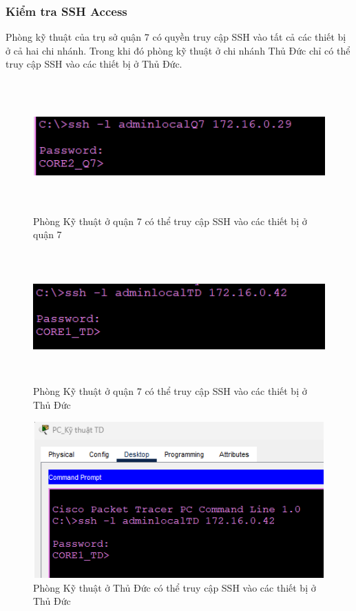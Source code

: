 \documentclass[a4paper, 12pt]{article}
\begin{document}
\subsubsection{Kiểm tra SSH Access}
\hspace*{0.25cm}Phòng kỹ thuật của trụ sở quận 7 có quyền truy cập SSH vào tất cả các thiết bị ở cả hai chi nhánh. Trong khi đó phòng kỹ thuật ở chi nhánh Thủ Đức chỉ có thể truy cập SSH vào các thiết bị ở Thủ Đức.\\
\begin{figure}[H]
    \centering
    \includegraphics[width=16cm, height=5cm]{img/ssh1.png}
    \caption{Phòng Kỹ thuật ở quận 7 có thể truy cập SSH vào các thiết bị ở quận 7}
    \label{hinhhsrp2}
\end{figure}
\begin{figure}[H]
    \centering
    \includegraphics[width=16cm, height=5cm]{img/ssh2.png}
    \caption{Phòng Kỹ thuật ở quận 7 có thể truy cập SSH vào các thiết bị ở Thủ Đức}
    \label{ssh2}
\end{figure}
\begin{figure}[H]
    \centering
    \includegraphics[width=16cm, height=6cm]{img/ssh3.png}
    \caption{Phòng Kỹ thuật ở Thủ Đức có thể truy cập SSH vào các thiết bị ở Thủ Đức}
    \label{ssh3}
\end{figure}
\end{document}
